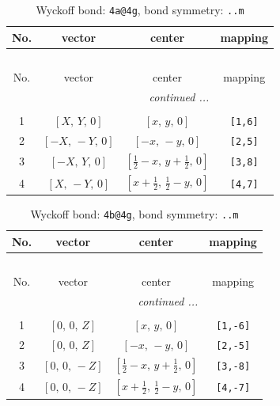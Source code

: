 \documentclass[fleqn,8pt]{jsarticle}
\begin{document}
\begin{longtable}{cccc}
\caption{Wyckoff bond: {\tt 4a@4g}, bond symmetry: {\tt ..m}}
 \\
 \hline \hline
No. & vector & center & mapping \\ \hline \endfirsthead

\multicolumn{3}{l}{\tablename\ \thetable{}} \\
 \hline \hline
No. & vector & center & mapping \\ \hline \endhead

 \hline \hline
\multicolumn{3}{r}{\footnotesize\it continued ...} \\ \endfoot

 \hline \hline
\multicolumn{3}{r}{} \\ \endlastfoot

1 & $\left[ X,\, Y,\, 0 \right]$ & $\left[ x,\, y,\, 0 \right]$ & {\tt [1,6]} \\ \hline
2 & $\left[ - X,\, - Y,\, 0 \right]$ & $\left[ - x,\, - y,\, 0 \right]$ & {\tt [2,5]} \\ \hline
3 & $\left[ - X,\, Y,\, 0 \right]$ & $\left[ \frac{1}{2} - x,\, y + \frac{1}{2},\, 0 \right]$ & {\tt [3,8]} \\ \hline
4 & $\left[ X,\, - Y,\, 0 \right]$ & $\left[ x + \frac{1}{2},\, \frac{1}{2} - y,\, 0 \right]$ & {\tt [4,7]} \\
\end{longtable}
\renewcommand{\arraystretch}{1.2}
\begin{longtable}{cccc}
\caption{Wyckoff bond: {\tt 4b@4g}, bond symmetry: {\tt ..m}}
 \\
 \hline \hline
No. & vector & center & mapping \\ \hline \endfirsthead

\multicolumn{3}{l}{\tablename\ \thetable{}} \\
 \hline \hline
No. & vector & center & mapping \\ \hline \endhead

 \hline \hline
\multicolumn{3}{r}{\footnotesize\it continued ...} \\ \endfoot

 \hline \hline
\multicolumn{3}{r}{} \\ \endlastfoot

1 & $\left[ 0,\, 0,\, Z \right]$ & $\left[ x,\, y,\, 0 \right]$ & {\tt [1,-6]} \\ \hline
2 & $\left[ 0,\, 0,\, Z \right]$ & $\left[ - x,\, - y,\, 0 \right]$ & {\tt [2,-5]} \\ \hline
3 & $\left[ 0,\, 0,\, - Z \right]$ & $\left[ \frac{1}{2} - x,\, y + \frac{1}{2},\, 0 \right]$ & {\tt [3,-8]} \\ \hline
4 & $\left[ 0,\, 0,\, - Z \right]$ & $\left[ x + \frac{1}{2},\, \frac{1}{2} - y,\, 0 \right]$ & {\tt [4,-7]} \\
\end{longtable}
\end{document}
